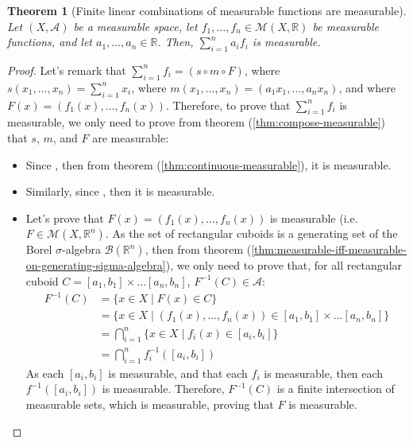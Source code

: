 \documentclass{article}
\newtheorem{theorem}{Theorem}[section]
\theoremstyle{definition}
\theoremstyle{remark}
\theoremstyle{example}
\theoremstyle{notation}
\begin{document}
\begin{theorem}[Finite linear combinations of measurable functions are measurable] \label{thm:linear-combination-measurable} %
		Let $(X, \mathcal{A})$ be a measurable space, let $f_1, \dots, f_n \in \mathcal{M}(X, \mathbb{R})$ be measurable functions, and let $a_1, \dots, a_n \in \mathbb{R}$. Then, $\sum_{i=1}^n a_i f_i$ is measurable.
\end{theorem}

\begin{proof}
		Let's remark that $\sum_{i=1}^n f_i = (s \circ m \circ F)$, where $s(x_1, \dots, x_n) = \sum_{i=1}^n x_i$, where $m(x_1, \dots, x_n) = (a_1 x_1, \dots, a_n x_n)$, and where $F(x) = (f_1(x), \dots, f_n(x))$. Therefore, to prove that $\sum_{i=1}^n f_i$ is measurable, we only need to prove from theorem (\ref{thm:compose-measurable}) that $s$, $m$, and $F$ are measurable:
		\begin{itemize}
				\item Since , then from theorem (\ref{thm:continuous-measurable}), it is measurable.
				\item Similarly, since , then it is measurable.
				\item Let's prove that $F(x) = (f_1(x), \dots, f_n(x))$ is measurable (i.e. $F \in \mathcal{M}(X, \mathbb{R}^n)$. As the set of rectangular cuboids is a generating set of the Borel $\sigma$-algebra $\mathcal{B}(\mathbb{R}^n)$, then from theorem (\ref{thm:measurable-iff-measurable-on-generating-sigma-algebra}), we only need to prove that, for all rectangular cuboid $C = [a_1, b_1] \times \dots [a_n, b_n]$, $F^{-1}(C) \in \mathcal{A}$:
				\begin{align*}
						F^{-1}(C) &= \{x \in X \mid F(x) \in C\}\\
						  &= \{x \in X \mid (f_1(x), \dots, f_n(x)) \in [a_1, b_1] \times \dots [a_n, b_n]\}\\
						  &= \bigcap_{i=1}^n \{x \in X \mid f_i(x) \in [a_i, b_i]\}\\
						  &= \bigcap_{i=1}^n f_i^{-1}([a_i, b_i])
				\end{align*}
				As each $[a_i, b_i]$ is measurable, and that each $f_i$ is measurable, then each $f^{-1}([a_i, b_i])$ is measurable. Therefore, $F^{-1}(C)$ is a finite intersection of measurable sets, which is measurable, proving that $F$ is measurable.
		\end{itemize}
\end{proof}
\end{document}
